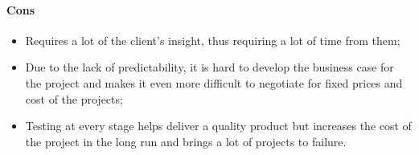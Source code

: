 \documentclass[main.tex]{subfiles}
\begin{document}
\paragraph{Cons}
\begin{itemize}
	\item Requires a lot of the client's insight, thus requiring a lot of time from them;
	\item Due to the lack of predictability, it is hard to develop the business case for the project and makes it even more difficult to negotiate for fixed prices and cost of the projects;
	\item Testing at every stage helps deliver a quality product but increases the cost of the project in the long run and brings a lot of projects to failure.
\end{itemize}

\nocite{*}
\end{document}
